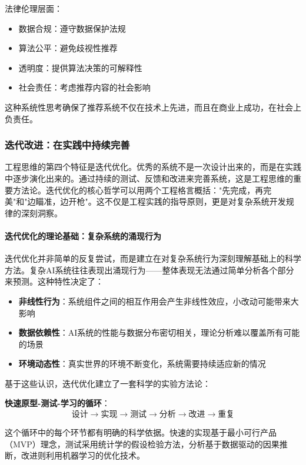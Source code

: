 法律伦理层面：
\begin{itemize}
\item 数据合规：遵守数据保护法规
\item 算法公平：避免歧视性推荐
\item 透明度：提供算法决策的可解释性
\item 社会责任：考虑推荐内容的社会影响
\end{itemize}

这种系统性思考确保了推荐系统不仅在技术上先进，而且在商业上成功，在社会上负责任。

\subsubsection{迭代改进：在实践中持续完善}

工程思维的第四个特征是迭代优化。优秀的系统不是一次设计出来的，而是在实践中逐步演化出来的。通过持续的测试、反馈和改进来完善系统，这是工程思维的重要方法论。迭代优化的核心哲学可以用两个工程格言概括："先完成，再完美"和"边瞄准，边开枪"。这不仅是工程实践的指导原则，更是对复杂系统开发规律的深刻洞察。

\paragraph{迭代优化的理论基础：复杂系统的涌现行为}
迭代优化并非简单的反复尝试，而是建立在对复杂系统行为深刻理解基础上的科学方法。复杂AI系统往往表现出涌现行为——整体表现无法通过简单分析各个部分来预测。这种特性决定了：

\begin{itemize}
\item \textbf{非线性行为}：系统组件之间的相互作用会产生非线性效应，小改动可能带来大影响
\item \textbf{数据依赖性}：AI系统的性能与数据分布密切相关，理论分析难以覆盖所有可能的场景
\item \textbf{环境动态性}：真实世界的环境不断变化，系统需要持续适应新的情况
\end{itemize}

基于这些认识，迭代优化建立了一套科学的实验方法论：

\textbf{快速原型-测试-学习的循环}：
$$\text{设计} \rightarrow \text{实现} \rightarrow \text{测试} \rightarrow \text{分析} \rightarrow \text{改进} \rightarrow \text{重复}$$

这个循环中的每个环节都有明确的科学依据。快速的实现基于最小可行产品（MVP）理念，测试采用统计学的假设检验方法，分析基于数据驱动的因果推断，改进则利用机器学习的优化技术。

